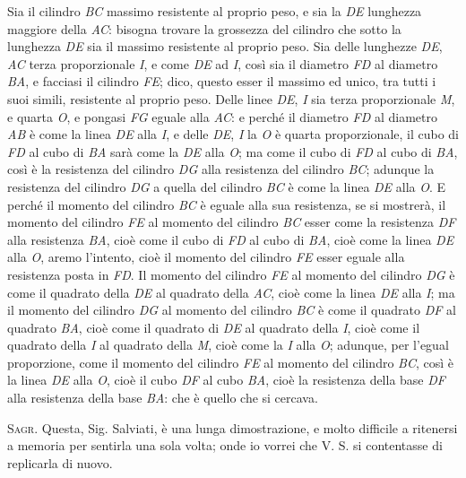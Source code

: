 \documentclass[11pt,twoside,openany]{book}
\newcommand{\speaker}[1]{\textcolor{rubric}{\textsc{#1}}\space}
\begin{document}
Sia il cilindro \emph{BC} massimo resistente al proprio peso, e sia la \emph{DE} lunghezza maggiore della \emph{AC}: bisogna trovare la grossezza del cilindro che sotto la lunghezza \emph{DE} sia il massimo resistente al proprio peso. Sia delle lunghezze \emph{DE}, \emph{AC} terza proporzionale \emph{I}, e come \emph{DE} ad \emph{I}, così sia il diametro \emph{FD} al diametro \emph{BA}, e facciasi il cilindro \emph{FE}; dico, questo esser il massimo ed unico, tra tutti i suoi simili, resistente al proprio peso. Delle linee \emph{DE}, \emph{I} sia terza proporzionale \emph{M}, e quarta \emph{O}, e pongasi \emph{FG} eguale alla \emph{AC}: e perché il diametro \emph{FD} al diametro \emph{AB} è come la linea \emph{DE} alla \emph{I}, e delle \emph{DE}, \emph{I} la \emph{O} è quarta proporzionale, il cubo di \emph{FD} al cubo di \emph{BA} sarà come la \emph{DE} alla \emph{O}; ma come il cubo di \emph{FD} al cubo di \emph{BA}, così è la resistenza del cilindro \emph{DG} alla resistenza del cilindro \emph{BC}; adunque la resistenza del cilindro \emph{DG} a quella del cilindro \emph{BC} è come la linea \emph{DE} alla \emph{O}. E perché il momento del cilindro \emph{BC} è eguale alla sua resistenza, se si mostrerà, il momento del cilindro \emph{FE} al momento del cilindro \emph{BC} esser come la resistenza \emph{DF} alla resistenza \emph{BA}, cioè come il cubo di \emph{FD} al cubo di \emph{BA}, cioè come la linea \emph{DE} alla \emph{O}, aremo l'intento, cioè il momento del cilindro \emph{FE} esser eguale alla resistenza posta in \emph{FD}. Il momento del cilindro \emph{FE} al momento del cilindro \emph{DG} è come il quadrato della \emph{DE} al quadrato della \emph{AC}, cioè come la linea \emph{DE} alla \emph{I}; ma il momento del cilindro \emph{DG} al momento del cilindro \emph{BC} è come il quadrato \emph{DF} al quadrato \emph{BA}, cioè come il quadrato di \emph{DE} al quadrato della \emph{I}, cioè come il quadrato della \emph{I} al quadrato della \emph{M}, cioè come la \emph{I} alla \emph{O}; adunque, per l'egual proporzione, come il momento del cilindro \emph{FE} al momento del cilindro \emph{BC}, così è la linea \emph{DE} alla \emph{O}, cioè il cubo \emph{DF} al cubo \emph{BA}, cioè la resistenza della base \emph{DF} alla resistenza della base \emph{BA}: che è quello che si cercava.

\speaker{Sagr.} Questa, Sig. Salviati, è una lunga dimostrazione, e molto difficile a ritenersi a memoria per sentirla una sola volta; onde io vorrei che V. S. si contentasse di replicarla di nuovo.
\end{document}
